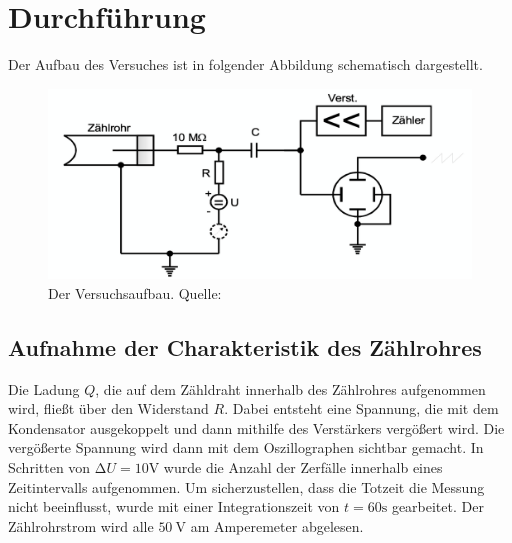 \section{Durchführung}
\label{sec:Durchführung}
Der Aufbau des Versuches ist in folgender Abbildung schematisch dargestellt.
  \begin{figure}[H]
    \centering
      \includegraphics[scale=0.6]{content/AufbauV703.png}
      \caption{Der Versuchsaufbau. Quelle:\cite{AP01}}
      \label{fig:aufbau3}
  \end{figure}
\noindent
\subsection{Aufnahme der Charakteristik des Zählrohres}
    Die Ladung $Q$, die auf dem Zähldraht innerhalb des Zählrohres aufgenommen wird, fließt über den
    Widerstand $R$. Dabei entsteht eine Spannung, die mit dem Kondensator ausgekoppelt und dann
    mithilfe des Verstärkers vergößert wird. Die vergößerte Spannung wird dann mit dem Oszillographen
    sichtbar gemacht. In Schritten von $\increment U = 10 \si{\volt}$ wurde die Anzahl der Zerfälle
    innerhalb eines Zeitintervalls aufgenommen. Um sicherzustellen, dass die Totzeit die Messung nicht
    beeinflusst, wurde mit einer Integrationszeit von $t = 60 \si{\second}$ gearbeitet. Der
    Zählrohrstrom wird alle $\SI{50}{\volt}$ am Amperemeter abgelesen.
